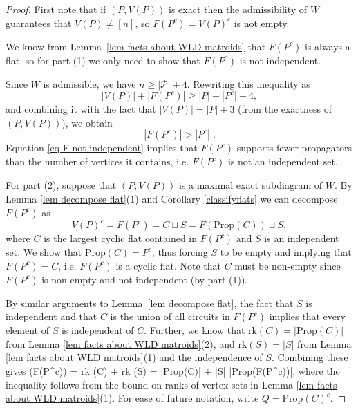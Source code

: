 \documentclass[11pt]{article}
\newcommand{\rk}{\textrm{rk} }
\def\ba #1\ea{\begin{align} #1 \end{align}}
\newcommand{\cP}{\mathcal{P}}
\newcommand{\Prop}{\textrm{Prop}}
\theoremstyle{remark}
\theoremstyle{definition}
\begin{document}
\begin{proof}

First note that if $(P,V(P))$ is exact then the admissibility of $W$ guarantees that $V(P) \neq [n]$, so $F(P^c) = V(P)^c$ is not empty. 

We know from Lemma~\ref{lem facts about WLD matroids} that $F(P^c)$ is always a flat, so for part (1) we only need to show that $F(P^c)$ is not independent.

Since $W$ is admissible, we have $n \geq |\cP| + 4$. Rewriting this inequality as
\[|V(P)| + |F(P^c)|  \geq  |P| + |P^c| +4,\]
and combining it with the fact that $|V(P)| = |P| + 3$ (from the exactness of $(P,V(P))$), we obtain
\begin{equation}\label{eq F not independent}|F(P^c)| > |P^c| \;.\end{equation}
Equation \eqref{eq F not independent} implies that $F(P^c)$ supports fewer propagators than the number of vertices it contains, i.e. $F(P^c)$ is not an independent set.

For part (2), suppose that $(P, V(P))$ is a maximal exact subdiagram of $W$. By Lemma \ref{lem decompose flat}(1) and Corollary \ref{classifyflats} we can decompose $F(P^c)$ as
\begin{equation}\label{eq decompose F}V(P)^c = F(P^c) = C \sqcup S = F(\Prop(C)) \sqcup S,\end{equation}
where $C$ is the largest cyclic flat contained in $F(P^c)$ and $S$ is an independent set. We show that $\Prop(C) = P^c$, thus forcing $S$ to be empty and implying that $F(P^c) = C$, i.e. $F(P^c)$ is a cyclic flat. Note that $C$ must be non-empty since $F(P^c)$ is non-empty and not independent (by part (1)). 

By similar arguments to Lemma~\ref{lem decompose flat}, the fact that $S$ is independent and that $C$ is the union of all circuits in $F(P^c)$ implies that every element of $S$ is independent of $C$. Further, we know that $\rk(C) = |\Prop(C)|$ from Lemma \ref{lem facts about WLD matroids}(2), and $\rk(S) = |S|$ from Lemma \ref{lem facts about WLD matroids}(1) and the independence of $S$.  Combining these gives
\ba \rk\big(F(P^c)\big) = \rk(C) + \rk(S)  = |\Prop(C)| + |S| \leq |\Prop(F(P^c))|\;,\label{rank of comp flat} \ea 
where the inequality follows from the bound on ranks of vertex sets in Lemma \ref{lem facts about WLD matroids}(1). For ease of future notation, write $Q = \Prop(C)^c$. 


\end{proof}
\end{document}
